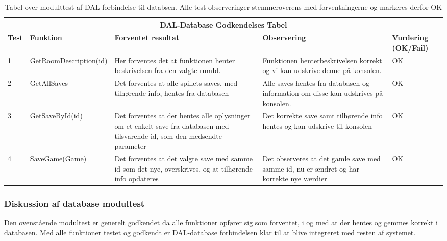 \begin{table}[H]
\caption{Tabel over modulttest af DAL forbindelse til databsen. Alle test observeringer stemmeroverens med forventningerne og markeres derfor OK }
\label{table:Modulttest-DB-Tabel}
\begin{tabular}{|p{0.75cm}|p{3.6cm}|p{3.5cm}|p{3.5cm}|p{1.9cm}|} \hline
\multicolumn{5}{|c|}{\textbf{DAL-Database Godkendelses Tabel}} \\ \hline
 \textbf{Test} & \textbf{Funktion} & \textbf{Forventet resultat} & \textbf{Observering} & \textbf{Vurdering} \textbf{(OK/Fail)}\\\hline
 1 & GetRoomDescription(id) & Her forventes det at funktionen henter beskrivelsen fra den valgte rumId. & Funktionen henterbeskrivelsen korrekt og vi kan udskrive denne på konsolen. & OK \\ \hline
 2 & GetAllSaves & Det forventes at alle spillets saves, med tilhørende info, hentes fra databasen & Alle saves hentes fra databasen og information om disse kan udskrives på konsolen. & OK \\ \hline
 3 & GetSaveById(id) & Det forventes at der hentes alle oplysninger om et enkelt save fra databasen med tilsvarende id, som den medsendte parameter & Det korrekte save samt tilhørende info hentes og kan udskrive til konsolen & OK \\ \hline
 4 & SaveGame(Game) & Det forventes at det valgte save med samme id som det nye, overskrives, og at tilhørende info opdateres & Det observeres at det gamle save med samme id, nu er ændret og har korrekte nye værdier & OK \\ \hline
\end{tabular}
\end{table}

\subsubsection{Diskussion af database modultest}

Den ovenstående modultest er generelt godkendet da alle funktioner opfører sig som forventet, i og med at der hentes og gemmes korrekt i databasen. Med alle funktioner testet og godkendt er DAL-database forbindelsen klar til at blive integreret med resten af systemet.
